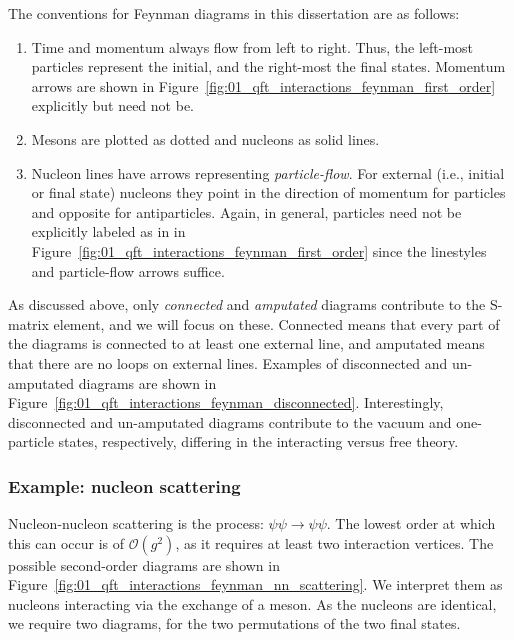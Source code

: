 The conventions for Feynman diagrams in this dissertation are as follows:
\begin{enumerate}
	\item Time and momentum always flow from left to right. 
	Thus, the left-most particles represent the initial, and the right-most the final states.
	Momentum arrows are shown in Figure~\ref{fig:01_qft_interactions_feynman_first_order} explicitly but need not be.
	\item Mesons are plotted as dotted and nucleons as solid lines.
	\item Nucleon lines have arrows representing \textit{particle-flow}.
	For external (i.e., initial or final state) nucleons they point in the direction of momentum for particles and opposite for antiparticles. 
	Again, in general, particles need not be explicitly labeled as in in Figure~\ref{fig:01_qft_interactions_feynman_first_order} since the linestyles and particle-flow arrows suffice.
\end{enumerate}

As discussed above, only \textit{connected} and \textit{amputated} diagrams contribute to the S-matrix element, and we will focus on these.
Connected means that every part of the diagrams is connected to at least one external line, and amputated means that there are no loops on external lines.
Examples of disconnected and un-amputated diagrams are shown in Figure~\ref{fig:01_qft_interactions_feynman_disconnected}.
Interestingly, disconnected and un-amputated diagrams contribute to the vacuum and one-particle states, respectively, differing in the interacting versus free theory.




\subsubsection{Example: nucleon scattering}

Nucleon-nucleon scattering is the process: $\psi\psi \rightarrow \psi\psi$.
The lowest order at which this can occur is of $\mathcal O(g^2)$, as it requires at least two interaction vertices.
The possible second-order diagrams are shown in Figure~\ref{fig:01_qft_interactions_feynman_nn_scattering}.
We interpret them as nucleons interacting via the exchange of a meson.
As the nucleons are identical, we require two diagrams, for the two permutations of the two final states.



